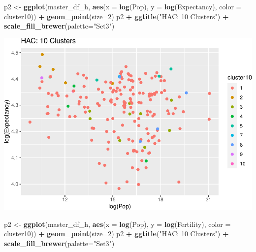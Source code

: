 \documentclass[]{article}
\newenvironment{Shaded}{\begin{snugshade}}{\end{snugshade}}
\newcommand{\DataTypeTok}[1]{\textcolor[rgb]{0.13,0.29,0.53}{#1}}
\newcommand{\DecValTok}[1]{\textcolor[rgb]{0.00,0.00,0.81}{#1}}
\newcommand{\KeywordTok}[1]{\textcolor[rgb]{0.13,0.29,0.53}{\textbf{#1}}}
\newcommand{\NormalTok}[1]{#1}
\newcommand{\OperatorTok}[1]{\textcolor[rgb]{0.81,0.36,0.00}{\textbf{#1}}}
\newcommand{\StringTok}[1]{\textcolor[rgb]{0.31,0.60,0.02}{#1}}
\begin{document}
\begin{Shaded}
\begin{Highlighting}[]
\NormalTok{p2 <-}\StringTok{ }\KeywordTok{ggplot}\NormalTok{(master_df_h, }\KeywordTok{aes}\NormalTok{(}\DataTypeTok{x =} \KeywordTok{log}\NormalTok{(Pop), }\DataTypeTok{y =} \KeywordTok{log}\NormalTok{(Expectancy), }\DataTypeTok{color =}\NormalTok{ cluster10)) }\OperatorTok{+}
\StringTok{  }\KeywordTok{geom_point}\NormalTok{(}\DataTypeTok{size=}\DecValTok{2}\NormalTok{)}
\NormalTok{p2 }\OperatorTok{+}\StringTok{ }\KeywordTok{ggtitle}\NormalTok{(}\StringTok{"HAC: 10 Clusters"}\NormalTok{) }\OperatorTok{+}\StringTok{ }\KeywordTok{scale_fill_brewer}\NormalTok{(}\DataTypeTok{palette=}\StringTok{"Set3"}\NormalTok{)}
\end{Highlighting}
\end{Shaded}

\includegraphics{eda_files/figure-latex/unnamed-chunk-31-6.pdf}

\begin{Shaded}
\begin{Highlighting}[]
\NormalTok{p2 <-}\StringTok{ }\KeywordTok{ggplot}\NormalTok{(master_df_h, }\KeywordTok{aes}\NormalTok{(}\DataTypeTok{x =} \KeywordTok{log}\NormalTok{(Pop), }\DataTypeTok{y =} \KeywordTok{log}\NormalTok{(Fertility), }\DataTypeTok{color =}\NormalTok{ cluster10)) }\OperatorTok{+}
\StringTok{  }\KeywordTok{geom_point}\NormalTok{(}\DataTypeTok{size=}\DecValTok{2}\NormalTok{)}
\NormalTok{p2 }\OperatorTok{+}\StringTok{ }\KeywordTok{ggtitle}\NormalTok{(}\StringTok{"HAC: 10 Clusters"}\NormalTok{) }\OperatorTok{+}\StringTok{ }\KeywordTok{scale_fill_brewer}\NormalTok{(}\DataTypeTok{palette=}\StringTok{"Set3"}\NormalTok{)}
\end{Highlighting}
\end{Shaded}
\end{document}
